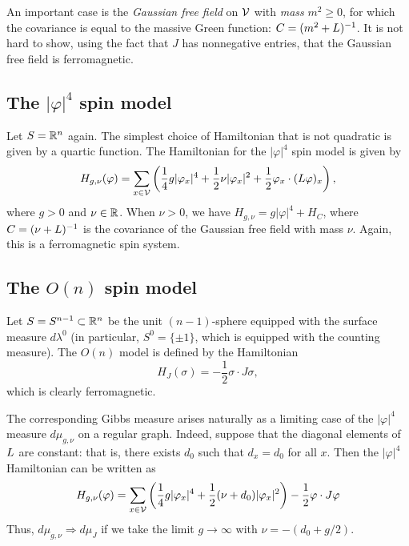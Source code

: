 An important case is the \emph{Gaussian free field} on $\mathcal{V}$ with \emph{mass} $m^2 \ge 0$,
for which the covariance is equal to the massive Green function: $C = (m^2 + L)^{-1}$.
It is not hard to show, using the fact that $J$ has nonnegative entries, that the Gaussian
free field is ferromagnetic.


\subsection{The \texorpdfstring{$|\varphi|^4$}{phi4} spin model}

Let $S = {\mathbb R}^n$ again.
The simplest choice of Hamiltonian that is not quadratic is given by a quartic function.
The Hamiltonian for the $|\varphi|^4$ spin model is given by
\begin{equation}
H_{g,\nu}(\varphi)
  =
\sum_{x\in\mathcal{V}}
\left(
  \frac{1}{4} g |\varphi_x|^4
    +
  \frac{1}{2} \nu |\varphi_x|^2
    +
  \frac{1}{2} \varphi_x \cdot (L \varphi)_x
\right),
\end{equation}
where $g > 0$ and $\nu\in{\mathbb R}$. When $\nu > 0$, we have $H_{g,\nu} = g |\varphi|^4 + H_C$,
where $C = (\nu + L)^{-1}$ is the covariance of the Gaussian free field with mass $\nu$.
Again, this is a ferromagnetic spin system.


\subsection{The \texorpdfstring{$O(n)$}{O(n)} spin model}

Let $S = S^{n-1} \subset {\mathbb R}^n$ be the unit $(n-1)$-sphere equipped with the surface measure
$d\lambda^0$ (in particular, $S^0 = \{ \pm 1 \}$, which is equipped with the counting measure).
The $O(n)$ model is defined by the Hamiltonian
\begin{equation}
H_J(\sigma) = -\frac{1}{2} \sigma \cdot J \sigma,
\end{equation}
which is clearly ferromagnetic.

The corresponding Gibbs measure arises naturally as a limiting case of the $|\varphi|^4$
measure $d\mu_{g,\nu}$ on a regular graph.
Indeed, suppose that the diagonal elements of $L$ are
constant: that is, there exists $d_0$ such that $d_x = d_0$ for all $x$.
Then the $|\varphi|^4$ Hamiltonian can be written as
\begin{equation}
H_{g,\nu}(\varphi)
  =
\sum_{x\in\mathcal{V}}
\left(
  \frac{1}{4} g |\varphi_x|^4
    +
  \frac{1}{2} (\nu + d_0) |\varphi_x|^2
\right)
  -
\frac{1}{2} \varphi \cdot J \varphi
\end{equation}
Thus, $d\mu_{g,\nu} \Rightarrow d\mu_J$
if we take the limit $g\to\infty$ with $\nu = -(d_0 + g / 2)$.

